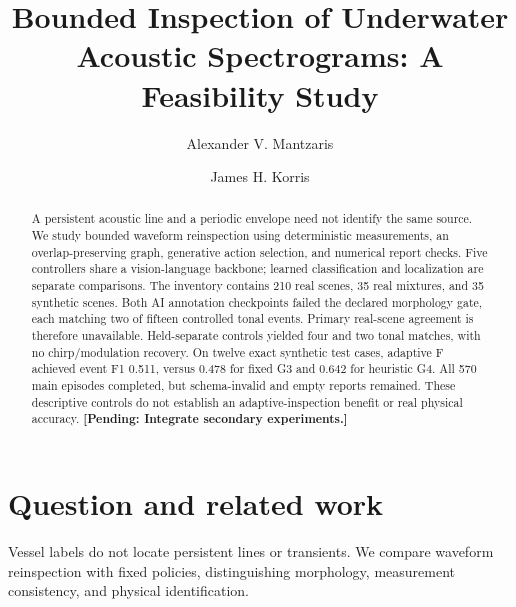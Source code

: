 \documentclass[runningheads,orivec]{llncs}
\newcommand{\pending}[1]{\iffinalresults
  \PackageError{research-results}{Unresolved result or protocol marker}{Resolve the marked item from recorded evidence before submission.}%
  \else\textbf{[Pending: #1]}\fi}
\newif\iffinalresults
\begin{document}
\raggedbottom
\title{Bounded Inspection of Underwater Acoustic Spectrograms: A Feasibility Study}
\author{Alexander V. Mantzaris \and James H. Korris}
\maketitle

\begin{abstract}
A persistent acoustic line and a periodic envelope need not identify the same source. We study bounded waveform reinspection using deterministic measurements, an overlap-preserving graph, generative action selection, and numerical report checks. Five controllers share a vision-language backbone; learned classification and localization are separate comparisons. The inventory contains 210 real scenes, 35 real mixtures, and 35 synthetic scenes. Both AI annotation checkpoints failed the declared morphology gate, each matching two of fifteen controlled tonal events. Primary real-scene agreement is therefore unavailable. Held-separate controls yielded four and two tonal matches, with no chirp/modulation recovery. On twelve exact synthetic test cases, adaptive F achieved event F1 0.511, versus 0.478 for fixed G3 and 0.642 for heuristic G4. All 570 main episodes completed, but schema-invalid and empty reports remained. These descriptive controls do not establish an adaptive-inspection benefit or real physical accuracy. \pending{Integrate secondary experiments.}
\end{abstract}

\section{Question and related work}
Vessel labels do not locate persistent lines or transients. We compare waveform reinspection with fixed policies, distinguishing morphology, measurement consistency, and physical identification.
\end{document}
